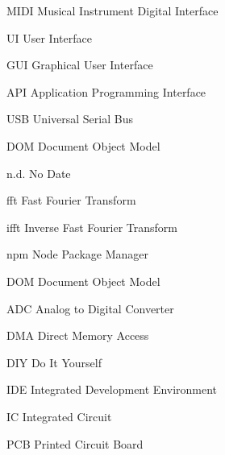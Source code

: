 \begin{acronyms}
  \item[MIDI] Musical Instrument Digital Interface
  \item[UI] User Interface
  \item[GUI] Graphical User Interface
  \item[API] Application Programming Interface
  \item[USB] Universal Serial Bus
  \item[DOM] Document Object Model
  \item[n.d.] No Date
  \item[fft] Fast Fourier Transform
  \item[ifft] Inverse Fast Fourier Transform
  \item[npm] Node Package Manager
  \item[DOM] Document Object Model
  \item[ADC] Analog to Digital Converter
  \item[DMA] Direct Memory Access
  \item[DIY] Do It Yourself
  \item[IDE] Integrated Development Environment
  \item[IC] Integrated Circuit
  \item[PCB] Printed Circuit Board
\end{acronyms}
